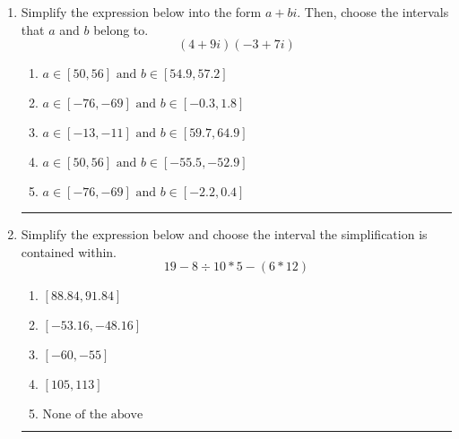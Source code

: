 \documentclass[14pt]{extbook}
\newcommand{\litem}[1]{\item#1\hspace*{-1cm}\rule{\textwidth}{0.4pt}}
\begin{document}
\begin{enumerate}
{\begin{enumerate}[label=\Alph*.]
\end{enumerate} }
\litem{
Simplify the expression below into the form $a+bi$. Then, choose the intervals that $a$ and $b$ belong to.\[ (4 + 9 i)(-3 + 7 i) \]\begin{enumerate}[label=\Alph*.]
\item \( a \in [50, 56] \text{ and } b \in [54.9, 57.2] \)
\item \( a \in [-76, -69] \text{ and } b \in [-0.3, 1.8] \)
\item \( a \in [-13, -11] \text{ and } b \in [59.7, 64.9] \)
\item \( a \in [50, 56] \text{ and } b \in [-55.5, -52.9] \)
\item \( a \in [-76, -69] \text{ and } b \in [-2.2, 0.4] \)

\end{enumerate} }
\litem{
Simplify the expression below and choose the interval the simplification is contained within.\[ 19 - 8 \div 10 * 5 - (6 * 12) \]\begin{enumerate}[label=\Alph*.]
\item \( [88.84, 91.84] \)
\item \( [-53.16, -48.16] \)
\item \( [-60, -55] \)
\item \( [105, 113] \)
\item \( \text{None of the above} \)

\end{enumerate} }
\end{enumerate}
\end{document}
